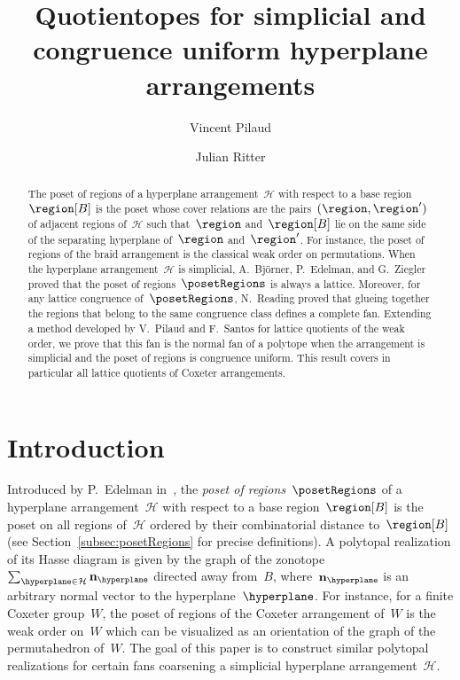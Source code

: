 \documentclass{amsart}
\title{Quotientopes for simplicial and congruence uniform hyperplane arrangements}
\author{Vincent Pilaud}
\author{Julian Ritter}
\theoremstyle{definition}
\newcommand{\darkblue}{\color{darkblue}} %
\newcommand{\defn}[1]{\textsl{\darkblue #1}} %
\newcommand{\arrangement}{\mathcal{H}} %
\newcommand{\normal}{\mathbf{n}} %
\begin{document}
\begin{abstract}
The poset of regions of a hyperplane arrangement~$\arrangement$ with respect to a base region~$\region[B]$ is the poset whose cover relations are the pairs~$(\region, \region')$ of adjacent regions of~$\arrangement$ such that~$\region$ and~$\region[B]$ lie on the same side of the separating hyperplane of~$\region$ and~$\region'$.
For instance, the poset of regions of the braid arrangement is the classical weak order on permutations.
When the hyperplane arrangement~$\arrangement$ is simplicial, A.~Bj\"orner, P.~Edelman, and G.~Ziegler proved that the poset of regions~$\posetRegions$ is always a lattice.
Moreover, for any lattice congruence of~$\posetRegions$, N.~Reading proved that glueing together the regions that belong to the same congruence class defines a complete fan.
Extending a method developed by V.~Pilaud and F.~Santos for lattice quotients of the weak order, we prove that this fan is the normal fan of a polytope when the arrangement is simplicial and the poset of regions is congruence uniform.
This result covers in particular all lattice quotients of Coxeter arrangements.
\end{abstract}

\maketitle

\section{Introduction}

Introduced by P.~Edelman in~\cite{Edelman}, the \defn{poset of regions}~$\posetRegions$ of a hyperplane arrangement~$\arrangement$ with respect to a base region~$\region[B]$ is the poset on all regions of~$\arrangement$ ordered by their combinatorial distance to~$\region[B]$ (see Section~\ref{subsec:posetRegions} for precise definitions).
A polytopal realization of its Hasse diagram is given by the graph of the zonotope~$\sum_{\hyperplane \in \arrangement} \normal_{\hyperplane}$ directed away from~$B$, where~$\normal_{\hyperplane}$ is an arbitrary normal vector to the hyperplane~$\hyperplane$.
For instance, for a finite Coxeter group~$W$, the poset of regions of the Coxeter arrangement of~$W$ is the weak order on~$W$ which can be visualized as an orientation of the graph of the permutahedron of~$W$.
The goal of this paper is to construct similar polytopal realizations for certain fans coarsening a simplicial hyperplane arrangement~$\arrangement$.
\end{document}
